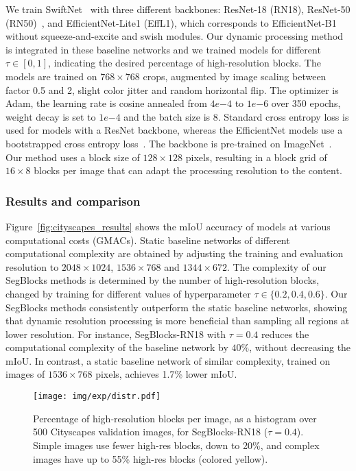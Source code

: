 We train SwiftNet~\cite{orsic_defense_2019} with three different backbones: ResNet-18 (RN18), ResNet-50 (RN50)~\cite{he_deep_2016}, and EfficientNet-Lite1 (EffL1), which corresponds to EfficientNet-B1~\cite{tan2019efficientnet} without squeeze-and-excite and swish modules. Our dynamic processing method is integrated in these baseline networks and we trained models for different $\tau \in [0,1]$, indicating the desired percentage of high-resolution blocks. 
The models are trained on $768{\times}768$ crops, augmented by image scaling between factor 0.5 and 2, slight color jitter and random horizontal flip. The optimizer is Adam, the learning rate is cosine annealed from $4e{{-}4}$  to $1e{{-}6}$ over 350 epochs, weight decay is set to $1e{-4}$ and the batch size is 8. Standard cross entropy loss is used for models with a ResNet backbone, whereas the EfficientNet models use a bootstrapped cross entropy loss~\cite{reed2014training_bootstrap}.  The backbone is pre-trained on ImageNet~\cite{deng_imagenet_2009}. Our method uses a block size of $128{\times}128$ pixels, resulting in a block grid of $16{\times}8$ blocks per image that can adapt the processing resolution to the content. 

\subsubsection{Results and comparison}

Figure~\ref{fig:cityscapes_results} shows the mIoU accuracy of models at various computational costs (GMACs). Static baseline networks of different computational complexity are obtained by adjusting the training and evaluation resolution to $2048{\times}1024$, $1536{\times}768$ and $1344{\times}672$. The complexity of our SegBlocks methods is determined by the number of high-resolution blocks, changed by training for different values of hyperparameter $\tau \in \{0.2,0.4,0.6\}$. 
Our SegBlocks methods consistently outperform the static baseline networks, showing that dynamic resolution processing is more beneficial than sampling all regions at lower resolution. For instance, SegBlocks-RN18 with $\tau{=}0.4$ reduces the computational complexity of the baseline network by $40\%$, without decreasing the mIoU. In contrast, a static baseline network of similar complexity, trained on images of $1536{\times}768$ pixels, achieves 1.7\% lower mIoU. 


\begin{figure}[tb!]
\centering
\texttt{[image: img/exp/distr.pdf]}
\caption{Percentage of high-resolution blocks per image, as a histogram over 500 Cityscapes validation images, for SegBlocks-RN18 ($\tau{=}0.4$). Simple images use fewer high-res blocks, down to 20\%, and complex images have up to 55\% high-res blocks (colored yellow).}
\label{fig:cityscapes_distr}
\end{figure}

